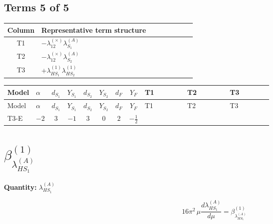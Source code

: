 \documentclass[8pt]{article}
\begin{document}
\begin{landscape}
\subsection*{Terms 5 of 5}
\begin{center}
\begin{tabular}{@{}c >{\raggedright\arraybackslash}p{0.82\linewidth}@{}}
\toprule
Column & Representative term structure \\
\midrule
T1 & \(\displaystyle -{\lambda_{12}^{(\times)}} {\lambda_{S_1}^{(A)}}\) \\
\midrule
T2 & \(\displaystyle -{\lambda_{12}^{(\times)}} {\lambda_{S_2}^{(A)}}\) \\
\midrule
T3 & \(\displaystyle +{\lambda_{HS_1}^{(1)}} {\lambda_{HS_2}^{(1)}}\) \\
\midrule
\bottomrule
\end{tabular}
\end{center}
\smallskip
\tiny
\begin{longtable}{@{}llcccccc >{\raggedright\arraybackslash}p{0.21\linewidth} >{\raggedright\arraybackslash}p{0.21\linewidth} >{\raggedright\arraybackslash}p{0.21\linewidth}@{}}
\toprule
Model & $\alpha$ & $d_{S_1}$ & $Y_{S_1}$ & $d_{S_2}$ & $Y_{S_2}$ & $d_F$ & $Y_F$ & T1 & T2 & T3 \\
\midrule
\endfirsthead
\toprule
Model & $\alpha$ & $d_{S_1}$ & $Y_{S_1}$ & $d_{S_2}$ & $Y_{S_2}$ & $d_F$ & $Y_F$ & T1 & T2 & T3 \\
\midrule
\endhead
T3-E & $-2$ & $3$ & $-1$ & $3$ & $0$ & $2$ & $-\frac{1}{2}$ & \scriptsize\adjustbox{max width=\linewidth}{$\begin{gathered} -{\lambda_{12}^{(\times)}} {\lambda_{S_1}^{(A)}}\end{gathered}$} & \scriptsize\adjustbox{max width=\linewidth}{$\begin{gathered} -{\lambda_{12}^{(\times)}} {\lambda_{S_2}^{(A)}}\end{gathered}$} & \scriptsize\adjustbox{max width=\linewidth}{$\begin{gathered} +{\lambda_{HS_1}^{(1)}} {\lambda_{HS_2}^{(1)}}\end{gathered}$} \\
\midrule
\bottomrule
\end{longtable}
\clearpage
\section*{$\beta_{\lambda_{HS_1}^{(A)}}^{(1)}$}
\noindent\textbf{Quantity: }$\lambda_{HS_1}^{(A)}$\par\smallskip
\[16\pi^2\,\mu\frac{d \lambda_{HS_1}^{(A)}}{d\mu}=\beta_{\lambda_{HS_1}^{(A)}}^{(1)}\]

\end{landscape}
\end{document}
